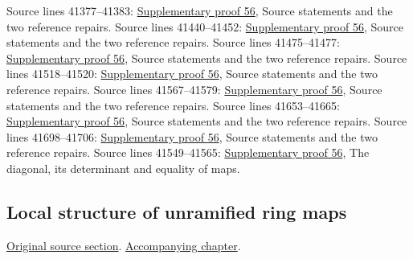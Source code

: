 \begin{AlgebraSourceRoutes}
 Source lines 41377--41383: \hyperlink{algebra_unramified_notes_20260928}{Supplementary proof 56}, Source statements and the two reference repairs.
 Source lines 41440--41452: \hyperlink{algebra_unramified_notes_20260928}{Supplementary proof 56}, Source statements and the two reference repairs.
 Source lines 41475--41477: \hyperlink{algebra_unramified_notes_20260928}{Supplementary proof 56}, Source statements and the two reference repairs.
 Source lines 41518--41520: \hyperlink{algebra_unramified_notes_20260928}{Supplementary proof 56}, Source statements and the two reference repairs.
 Source lines 41567--41579: \hyperlink{algebra_unramified_notes_20260928}{Supplementary proof 56}, Source statements and the two reference repairs.
 Source lines 41653--41665: \hyperlink{algebra_unramified_notes_20260928}{Supplementary proof 56}, Source statements and the two reference repairs.
 Source lines 41698--41706: \hyperlink{algebra_unramified_notes_20260928}{Supplementary proof 56}, Source statements and the two reference repairs.
 Source lines 41549--41565: \hyperlink{algebra_unramified_notes_20260928}{Supplementary proof 56}, The diagonal, its determinant and equality of maps.
\end{AlgebraSourceRoutes}

\subsection{Local structure of unramified ring maps}
\hypertarget{algebra-source-section-local-structure-unramified}{}
\noindent\href{https://github.com/stacks/stacks-project/blob/a04446e57ec1fbc252a871afcec7752fb2807b14/algebra.tex\#L41712}{Original source section}. \href{algebra.pdf\#nameddest=section-local-structure-unramified}{Accompanying chapter}.

